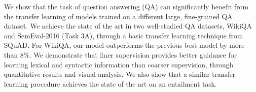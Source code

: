 We show that the task of question answering (QA) can significantly benefit from the transfer learning of models trained on a different large, fine-grained QA dataset. We achieve the state of the art in two well-studied QA datasets, WikiQA and SemEval-2016 (Task 3A), through a basic transfer learning technique from SQuAD. For WikiQA, our model outperforms the previous best model by more than 8\%. We demonstrate that finer supervision provides better guidance for learning lexical and syntactic information than coarser supervision, through quantitative results and visual analysis. We also show that a similar transfer learning procedure  achieves  the state of the art on an entailment task.
